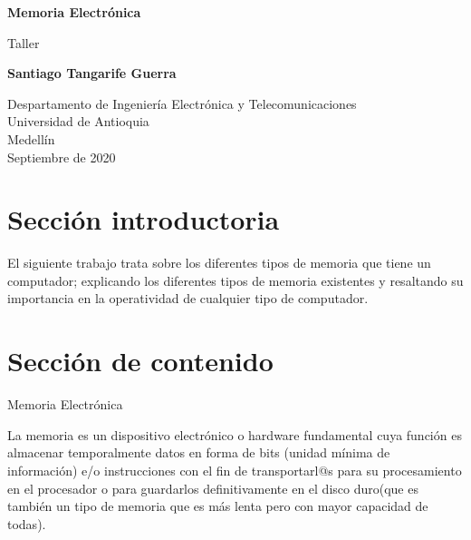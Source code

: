 \documentclass{article}
\begin{document}
\begin{titlepage}
    \begin{center}
        \vspace*{1cm}
        
        \Huge
        \textbf{Memoria Electrónica}
        
        \vspace{0.5cm}
        \LARGE
        Taller
            
        \vspace{1.5cm}
            
        \textbf{Santiago Tangarife Guerra}
            
        \vfill
            
        \vspace{0.8cm}
            
        \Large
        Despartamento de Ingeniería Electrónica y Telecomunicaciones\\
        Universidad de Antioquia\\
        Medellín\\
        Septiembre de 2020
            
    \end{center}
\end{titlepage}

\tableofcontents

\section{Sección introductoria}
El siguiente trabajo trata sobre los diferentes tipos de memoria que tiene un computador; explicando los diferentes tipos de memoria existentes y resaltando su importancia en la operatividad de cualquier tipo de computador.
\section{Sección de contenido} \label{contenido}
    \begin{center}
    \LARGE
        Memoria Electrónica
    \end{center}
    
La memoria es un dispositivo electrónico o hardware fundamental cuya función es almacenar temporalmente datos en forma de bits (unidad mínima de información) e/o instrucciones con el fin de transportarl@s para su procesamiento en el procesador o para guardarlos definitivamente en el disco duro(que es también un tipo de memoria que es más lenta pero con mayor capacidad de todas).
\end{document}
